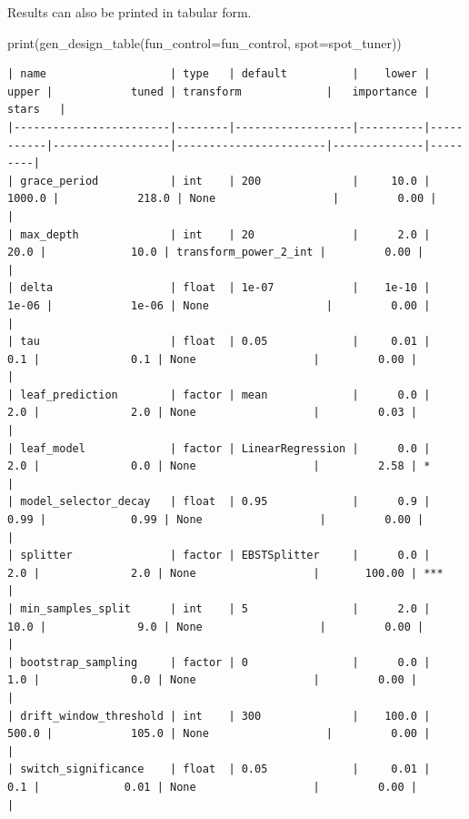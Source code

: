 \documentclass[
  letterpaper,
  DIV=11,
  numbers=noendperiod]{scrreprt}
\newenvironment{Shaded}{\begin{snugshade}}{\end{snugshade}}
\newcommand{\BuiltInTok}[1]{\textcolor[rgb]{0.00,0.23,0.31}{#1}}
\newcommand{\NormalTok}[1]{\textcolor[rgb]{0.00,0.23,0.31}{#1}}
\newcommand{\OperatorTok}[1]{\textcolor[rgb]{0.37,0.37,0.37}{#1}}
\begin{document}
Results can also be printed in tabular form.

\begin{Shaded}
\begin{Highlighting}[]
\BuiltInTok{print}\NormalTok{(gen\_design\_table(fun\_control}\OperatorTok{=}\NormalTok{fun\_control, spot}\OperatorTok{=}\NormalTok{spot\_tuner))}
\end{Highlighting}
\end{Shaded}

\begin{verbatim}
| name                   | type   | default          |    lower |     upper |            tuned | transform             |   importance | stars   |
|------------------------|--------|------------------|----------|-----------|------------------|-----------------------|--------------|---------|
| grace_period           | int    | 200              |     10.0 |    1000.0 |            218.0 | None                  |         0.00 |         |
| max_depth              | int    | 20               |      2.0 |      20.0 |             10.0 | transform_power_2_int |         0.00 |         |
| delta                  | float  | 1e-07            |    1e-10 |     1e-06 |            1e-06 | None                  |         0.00 |         |
| tau                    | float  | 0.05             |     0.01 |       0.1 |              0.1 | None                  |         0.00 |         |
| leaf_prediction        | factor | mean             |      0.0 |       2.0 |              2.0 | None                  |         0.03 |         |
| leaf_model             | factor | LinearRegression |      0.0 |       2.0 |              0.0 | None                  |         2.58 | *       |
| model_selector_decay   | float  | 0.95             |      0.9 |      0.99 |             0.99 | None                  |         0.00 |         |
| splitter               | factor | EBSTSplitter     |      0.0 |       2.0 |              2.0 | None                  |       100.00 | ***     |
| min_samples_split      | int    | 5                |      2.0 |      10.0 |              9.0 | None                  |         0.00 |         |
| bootstrap_sampling     | factor | 0                |      0.0 |       1.0 |              0.0 | None                  |         0.00 |         |
| drift_window_threshold | int    | 300              |    100.0 |     500.0 |            105.0 | None                  |         0.00 |         |
| switch_significance    | float  | 0.05             |     0.01 |       0.1 |             0.01 | None                  |         0.00 |         |

\end{verbatim}
\end{document}
